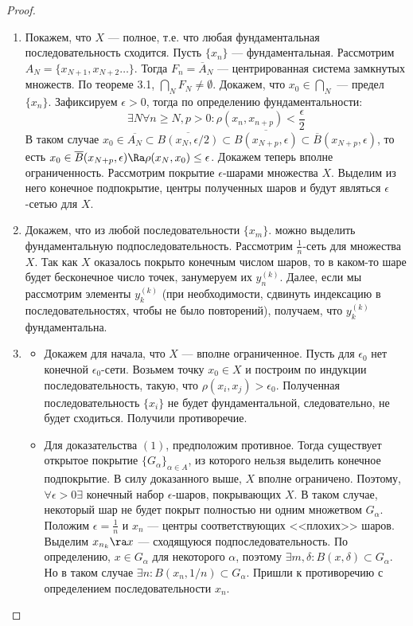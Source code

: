 \begin{proof}\indent
    \begin{enumerate}
        \item[\((1) \Ra (2)\)] Покажем, что \(X\) --- полное, т.е. что любая фундаментальная последовательность сходится. Пусть \(\{x_n\}\) --- фундаментальная. Рассмотрим \(A_N = \{x_{N + 1}, x_{N + 2} \dots \}\). Тогда \(F_n = \overline{A}_N\) --- центрированная система замкнутых множеств. По теореме 3.1, \(\bigcap_{N} F_N \ne \emptyset\). Докажем, что \(x_0 \in \bigcap_{N}\) --- предел \(\{x_n\}\). Зафиксируем \(\epsilon > 0\), тогда по определению фундаментальности:
        \[\exists N \forall n \ge N, p > 0: \rho(x_n, x_{n + p}) < \frac{\epsilon}{2}\]
        В таком случае \(x_0 \in \overline{A_N} \subset \overline{B(x_N, \epsilon/2)} \subset \overline{B(x_{N + p}, \epsilon)} \subset \overline{B}(x_{N + p}, \epsilon)\), то есть \(x_0 \in \overline{B}(x_{N + p}, \epsilon) \Ra \rho(x_N, x_0) \le \epsilon\). Докажем теперь вполне ограниченность. Рассмотрим покрытие \(\epsilon\)-шарами множества \(X\). Выделим из него конечное подпокрытие, центры полученных шаров и будут являться \(\epsilon\)-сетью для \(X\).
        \item[\((2) \Ra (3)\)] Докажем, что из любой последовательности \(\{x_m\}\). можно выделить фундаментальную подпоследовательность. Рассмотрим \(\frac{1}{n}\)-сеть для множества \(X\). Так как \(X\) оказалось покрыто конечным числом шаров, то в каком-то шаре будет бесконечное число точек, занумеруем их \(y_n^{(k)}\). Далее, если мы рассмотрим элементы \(y_k^{(k)}\) (при необходимости, сдвинуть индексацию в последовательностях, чтобы не было повторений), получаем, что \(y_k^{(k)}\) фундаментальна.
        \item[\((3) \Ra (1)\)] \begin{itemize}
            \item Докажем для начала, что \(X\) --- вполне ограниченное. Пусть для \(\epsilon_0\) нет конечной \(\epsilon_0\)-сети. Возьмем точку \(x_0 \in X\) и построим по индукции последовательность, такую, что \(\rho(x_i, x_j) > \epsilon_0\). Полученная последовательность \(\{x_i\}\) не будет фундаментальной, следовательно, не будет сходиться. Получили противоречие.
            \item Для доказательства \((1)\), предположим противное. Тогда существует открытое покрытие \(\{G_\alpha\}_{\alpha \in A}\), из которого нельзя выделить конечное подпокрытие. В силу доказанного выше, \(X\) вполне ограничено. Поэтому, \(\forall \epsilon > 0 \exists\) конечный набор \(\epsilon\)-шаров, покрывающих \(X\). В таком случае, некоторый шар не будет покрыт полностью ни одним множетвом \(G_\alpha\). Положим \(\epsilon = \frac{1}{n}\) и \(x_n\) --- центры соответствующих <<плохих>> шаров. Выделим \(x_{n_k} \ra x\) --- сходящуюся подпоследовательность. По определению, \(x \in G_\alpha\) для некоторого \(\alpha\), поэтому \(\exists m, \delta: B(x, \delta) \subset G_\alpha\). Но в таком случае \(\exists n: B(x_n, 1/n) \subset G_\alpha\). Пришли к противоречию с определением последовательности \(x_n\).

\end{itemize}
\end{enumerate}
\end{proof}
